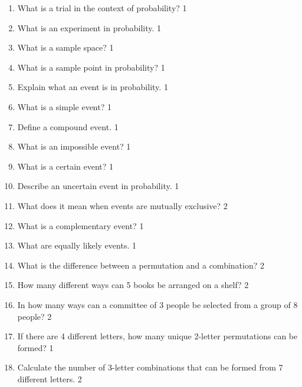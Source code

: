 \documentclass[a4paper,oneside, margin=1.4in]{book}
\begin{document}
  \begin{enumerate}
    \item What is a trial in the context of probability? \hfill 1

\item What is an experiment in probability. \hfill 1

\item What is a sample space? \hfill 1

\item What is a sample point in probability? \hfill 1

\item Explain what an event is in probability. \hfill 1

\item What is a simple event? \hfill 1

\item Define a compound event. \hfill 1

\item What is an impossible event? \hfill 1

\item What is a certain event? \hfill 1

\item Describe an uncertain event in probability. \hfill 1

\item What does it mean when events are mutually exclusive? \hfill 2

\item What is a complementary event? \hfill 1

\item What are equally likely events. \hfill 1

\item What is the difference between a permutation and a combination? \hfill 2

\item How many different ways can 5 books be arranged on a shelf? \hfill 2

\item In how many ways can a committee of 3 people be selected from a group of 8 people? \hfill 2

\item If there are 4 different letters, how many unique 2-letter permutations can be formed? \hfill 1

\item Calculate the number of 3-letter combinations that can be formed from 7 different letters. \hfill 2


\end{enumerate}
\end{document}
